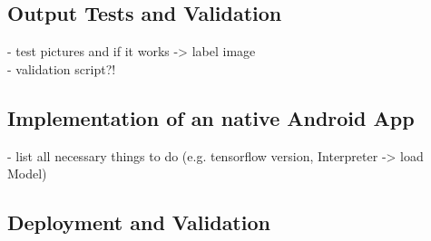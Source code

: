 	\subsection{Output Tests and Validation}
	 	- test pictures and if it works -> label image \\
	 	- validation script?!

	\subsection{Implementation of an native Android App}
		- list all necessary things to do (e.g. tensorflow version, Interpreter -> load Model)

	\subsection{Deployment and Validation}
